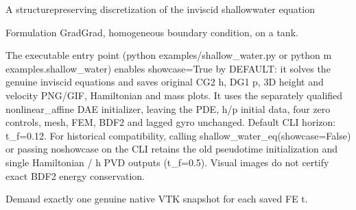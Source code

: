 \documentclass[letterpaper,10pt,english]{sphinxmanual}
\begin{document}
\begin{fulllineitems}

\pysigstartsignatures
\pysiglinewithargsret
{}
{\sphinxparamcomma {}\sphinxparamcomma {}\sphinxparamcomma {}\sphinxparamcomma {}\sphinxparamcomma {}\sphinxparamcomma {}}
{}
\pysigstopsignatures
\sphinxAtStartPar
A structure\sphinxhyphen{}preserving discretization of the inviscid shallow\sphinxhyphen{}water equation

\sphinxAtStartPar
Formulation Grad\sphinxhyphen{}Grad, homogeneous boundary condition, on a tank.

\sphinxAtStartPar
The executable entry point (python examples/shallow\_water.py or
python \sphinxhyphen{}m examples.shallow\_water) enables showcase=True by DEFAULT:
it solves the genuine inviscid equations and saves original CG2 h,
DG1 p, 3\sphinxhyphen{}D height and velocity PNG/GIF, Hamiltonian and mass plots.
It uses the separately qualified nonlinear\_affine DAE initializer,
leaving the PDE, h/p initial data, four zero controls, mesh, FEM,
BDF2 and lagged gyro unchanged. Default CLI horizon: t\_f=0.12.
For historical compatibility, calling shallow\_water\_eq(showcase=False)
or passing \textendash{}no\sphinxhyphen{}showcase on the CLI retains the old pseudo\sphinxhyphen{}time
initialization and single Hamiltonian / h PVD outputs (t\_f=0.5).
Visual images do not certify exact BDF2 energy conservation.

\end{fulllineitems}



\begin{fulllineitems}

\pysigstartsignatures
\pysiglinewithargsret
{}
{\sphinxparamcomma {}\sphinxparamcomma {}}
{}
\pysigstopsignatures
\sphinxAtStartPar
Demand exactly one genuine native VTK snapshot for each saved FE t.

\end{fulllineitems}
\end{document}
